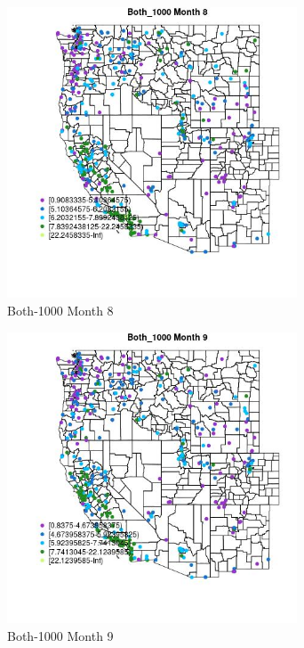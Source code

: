 \begin{figure} 
\centering  
\includegraphics[width=0.77\textwidth]{Code_Outputs/ML_input_report_ML_input_PM25_Step5_part_d_de_duplicated_aves_ML_input_MapObsMo8Both_1000.jpg} 
\caption{\label{fig:ML_input_report_ML_input_PM25_Step5_part_d_de_duplicated_aves_ML_inputMapObsMo8Both_1000}Both-1000 Month 8} 
\end{figure} 
 

\begin{figure} 
\centering  
\includegraphics[width=0.77\textwidth]{Code_Outputs/ML_input_report_ML_input_PM25_Step5_part_d_de_duplicated_aves_ML_input_MapObsMo9Both_1000.jpg} 
\caption{\label{fig:ML_input_report_ML_input_PM25_Step5_part_d_de_duplicated_aves_ML_inputMapObsMo9Both_1000}Both-1000 Month 9} 
\end{figure} 
 

